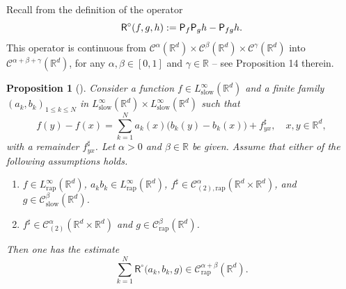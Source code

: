 \documentclass[JEP,XML,SOM,Unicode,published]{cedram}
\newenvironment{enumeratea}
{\bgroup\def\theenumi{\alph{enumi}}\begin{enumerate}}
{\end{enumerate}\egroup}
\theoremstyle{plain}
\newtheorem{prop}[thm]{Proposition}
\theoremstyle{definition}
\newcommand{\rap}{\mathrm{rap}}
\newcommand{\slow}{\mathrm{slow}}
\newcommand{\sfR}{\mathsf{R}}
\newcommand{\bbR}{\mathbb{R}}
\newcommand{\mcC}{\mathcal{C}}
\begin{document}
Recall from \cite{BB16} the definition of the operator
\[
{\sfR}^\circ(f,g,h) := {\sf P}_f{\sf P}_gh - {\sf P}_{fg}h.
\]
This operator is continuous from $\mcC^\alpha(\bbR^d)\times \mcC^\beta(\bbR^d)\times \mcC^\gamma(\bbR^d)$ into $\mcC^{\alpha+\beta+\gamma}(\bbR^d)$, for any $\alpha,\beta\in[0,1]$ and $\gamma\in\bbR$ -- see Proposition 14 therein.

\begin{prop}[{\cite[Prop.\,10]{BH}}]
\label{prop:sum of R}
Consider a function $f\in L_\slow^\infty(\bbR^d)$ and a finite family $(a_k,b_k)_{1\le k\le N}$ in $L_\slow^\infty(\bbR^d)\times L_\slow^\infty(\bbR^d)$ such that
\[
f(y)-f(x) = \sum_{k=1}^N a_k(x)\bigl(b_k(y)-b_k(x)\bigr) + f_{yx}^\sharp,\quad x,y\in\bbR^d,
\]
with a remainder $f_{yx}^\sharp$.
Let $\alpha>0$ and $\beta\in\bbR$ be given. Assume that either of the following assumptions holds.
\begin{enumeratea}
\item\label{prop:sum of Ra} $f\in L_\rap^\infty(\bbR^d)$, $a_kb_k\in L_\rap^\infty(\bbR^d)$, $f^\sharp\in\mcC_{(2),\rap}^\alpha(\bbR^d\times\bbR^d)$, and $g\in \mcC_\slow^\beta(\bbR^d)$.
\item\label{prop:sum of Rb} $f^\sharp\in\mcC_{(2)}^\alpha(\bbR^d\times\bbR^d)$ and $g\in \mcC_\rap^\beta(\bbR^d)$.
\end{enumeratea}
Then one has the estimate
\[
\sum_{k=1}^N {\sfR}^\circ\bigl(a_k,b_k,g\bigr)\in \mcC_\rap^{\alpha+\beta}(\bbR^d).
\]
\end{prop}
\end{document}
